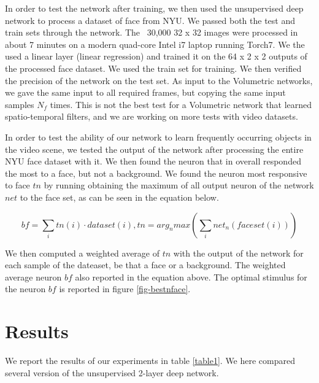 \documentclass{article} %
\begin{document}
In order to test the network after training, we then used the unsupervised deep network to process a dataset of face from NYU. We passed both the test and train sets through the network. The ~30,000 32 x 32 images were processed in about 7 minutes on a modern quad-core Intel i7 laptop running Torch7. We the used a linear layer (linear regression) and trained it on the 64 x 2 x 2 outputs of the processed face dataset. We used the train set for training. We then verified the precision of the network on the test set.
As input to the Volumetric networks, we gave the same input to all required frames, but copying the same input samples $N_f$ times. This is not the best test for a Volumetric network that learned spatio-temporal filters, and we are working on more tests with video datasets.

In order to test the ability of our network to learn frequently occurring objects in the video scene, we tested the output of the network after processing the entire NYU face dataset with it. We then found the neuron that in overall responded the most to a face, but not a background. We found the neuron most responsive to face $tn$ by running obtaining the maximum of all output neuron of the network $net$ to the face set, as can be seen in the equation below. 

\begin{equation}
bf = \sum_i tn(i) \cdot dataset(i),  tn = arg_n max( \sum_i net_n(faceset(i) ) )
\end{equation}

We then computed a weighted average of $tn$ with the output of the network for each sample of the dateaset, be that a face or a background. The weighted average neuron $bf$ also reported in the equation above. The optimal stimulus for the neuron $bf$ is reported in figure \ref{fig-bestnface}.





\section{Results}
\label{sec-results}


We report the results of our experiments in table \ref{table1}. We here compared several version of the unsupervised 2-layer deep network. 
\end{document}
